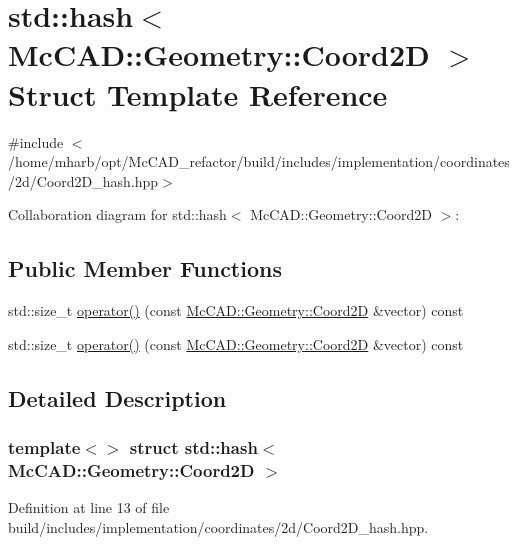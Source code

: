 \hypertarget{structstd_1_1hash_3_01McCAD_1_1Geometry_1_1Coord2D_01_4}{}\section{std\+:\+:hash$<$ Mc\+C\+AD\+:\+:Geometry\+:\+:Coord2D $>$ Struct Template Reference}
\label{structstd_1_1hash_3_01McCAD_1_1Geometry_1_1Coord2D_01_4}


{\ttfamily \#include $<$/home/mharb/opt/\+Mc\+C\+A\+D\+\_\+refactor/build/includes/implementation/coordinates/2d/\+Coord2\+D\+\_\+hash.\+hpp$>$}



Collaboration diagram for std\+:\+:hash$<$ Mc\+C\+AD\+:\+:Geometry\+:\+:Coord2D $>$\+:
\subsection*{Public Member Functions}
\begin{DoxyCompactItemize}
\item 
std\+::size\+\_\+t \hyperlink{structstd_1_1hash_3_01McCAD_1_1Geometry_1_1Coord2D_01_4_a9441004df077b8b900976e7c16f793b0}{operator()} (const \hyperlink{classMcCAD_1_1Geometry_1_1Coord2D}{Mc\+C\+A\+D\+::\+Geometry\+::\+Coord2D} \&vector) const
\item 
std\+::size\+\_\+t \hyperlink{structstd_1_1hash_3_01McCAD_1_1Geometry_1_1Coord2D_01_4_a9441004df077b8b900976e7c16f793b0}{operator()} (const \hyperlink{classMcCAD_1_1Geometry_1_1Coord2D}{Mc\+C\+A\+D\+::\+Geometry\+::\+Coord2D} \&vector) const
\end{DoxyCompactItemize}


\subsection{Detailed Description}
\subsubsection*{template$<$$>$\newline
struct std\+::hash$<$ Mc\+C\+A\+D\+::\+Geometry\+::\+Coord2\+D $>$}



Definition at line 13 of file build/includes/implementation/coordinates/2d/\+Coord2\+D\+\_\+hash.\+hpp.



